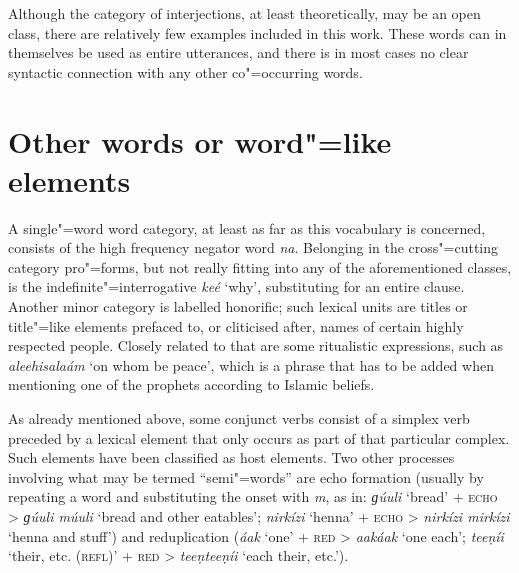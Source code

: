 Although the category of interjections, at least theoretically, may be an open class, there are relatively few examples included in this work. These words can in themselves be used as entire utterances, and there is in most cases no clear syntactic connection with any other co"=occurring words.


\section{Other words or word"=like elements}
\label{sec:3b-15}
A single"=word word category, at least as far as this vocabulary is concerned, consists of the high frequency negator word \textit{na}. Belonging in the cross"=cutting category pro"=forms, but not really fitting into any of the aforementioned classes, is the indefinite"=interrogative \textit{keé} `why', substituting for an entire clause. Another minor category is labelled honorific; such lexical units are titles or title"=like elements prefaced to, or cliticised after, names of certain highly respected people. Closely related to that are some ritualistic expressions, such as \textit{aleehisalaám} `on whom be peace', which is a phrase that has to be added when mentioning one of the prophets according to Islamic beliefs.


As already mentioned above, some conjunct verbs consist of a simplex verb preceded by a lexical element that only occurs as part of that particular complex. Such elements have been classified as host elements. Two other processes involving what may be termed ``semi"=words'' are echo formation (usually by repeating a word and substituting the onset with \textit{m}, as in: \textit{ɡúuli} `bread' + \textsc{echo} > \textit{ɡúuli múuli} `bread and other eatables'; \textit{nirkízi} `henna' + \textsc{echo} > \textit{nirkízi mirkízi} `henna and stuff') and reduplication (\textit{áak} `one' + \textsc{red} > \textit{aakáak} `one each'; \textit{teeṇíi} `their, etc. (\textsc{refl})' + \textsc{red} > \textit{teeṇteeṇíi} `each their, etc.').

